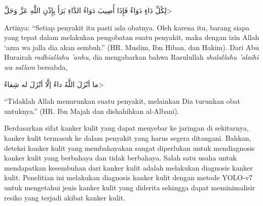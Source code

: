     \begin{flushright}
        \<لِكُلِّ دَاءٍ دَوَاءٌ فَإِذَا أُصِيبَ دَوَاءُ الدَّاءِ بَرَأَ بِإِذْنِ اللَّهِ عَزَّ وَجَلَّ>
    \end{flushright}

    Artinya: “Setiap penyakit itu pasti ada obatnya. Oleh karena itu, barang siapa yang tepat dalam melakukan pengobatan suatu penyakit, maka dengan izin Allah ‘azza wa  jalla dia akan sembuh.” (HR. Muslim, Ibn Hiban, dan Hakim). Dari Abu Hurairah \textit{radhiallahu 'anhu}, dia mengabarkan bahwa Rasulullah \textit{shalallahu 'alaihi wa sallam} bersabda,

    \begin{flushright}
        \<ما أنْزَلَ اللَّهُ داءً إلَّا أنْزَلَ له شِفاءً>
    \end{flushright}

    “Tidaklah Allah menurunkan suatu penyakit, melainkan Dia turunkan obat untuknya.” (HR. Ibn Majah dan dishahihkan al-Albani).

    Berdasarkan sifat kanker kulit yang dapat menyebar ke jaringan di sekitarnya, kanker kulit termasuk ke dalam penyakit yang harus segera ditangani. Bahkan, deteksi kanker kulit yang membahayakan sangat diperlukan untuk mendiagnosis kanker kulit yang berbahaya dan tidak berbahaya. Salah satu usaha untuk mendapatkan kesembuhan dari kanker kulit adalah melakukan diagnosis kanker kulit. Penelitian ini melakukan diagnosis kanker kulit dengan metode YOLO-v7 untuk mengetahui jenis kanker kulit yang diderita sehingga dapat meminimalisir resiko yang terjadi akibat kanker kulit.








